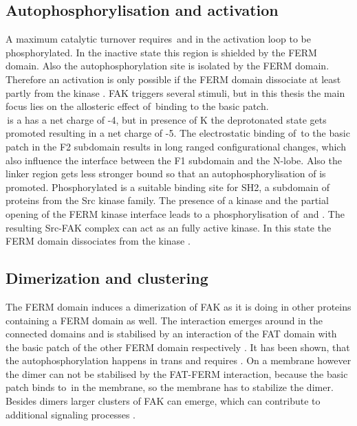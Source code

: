 \subsection{Autophosphorylisation and activation}
A maximum catalytic turnover requires \,and  in the activation loop to be phosphorylated. In the inactive state this region is shielded by the FERM domain. Also the autophosphorylation site  is isolated by the FERM domain. Therefore an activation is only possible if the FERM domain dissociate at least partly from the kinase \autocite{structFAK}. FAK triggers several stimuli, but in this thesis the main focus lies on the allosteric effect of \pip\,binding to the basic patch.\\
\pip\,is a has a net charge of -4, but in presence of K the deprotonated state gets promoted resulting in a net charge of -5. The electrostatic binding of \pip\,to the basic patch in the F2 subdomain results in long ranged configurational changes, which also influence the interface between the F1 subdomain and the N-lobe. Also the linker region gets less stronger bound so that an autophosphorylisation of  is promoted. Phosphorylated  is a suitable binding site for SH2, a subdomain of proteins from the Src kinase family. The presence of a kinase and the partial opening of the FERM kinase interface leads to a phosphorylisation of \,and . The resulting Src-FAK complex can act as an fully active kinase. In this state the FERM domain dissociates from the kinase \autocites{pap003}{pap001}.
\subsection{Dimerization and clustering}
The FERM domain induces a dimerization of FAK as it is doing in other proteins containing a FERM domain as well. The interaction emerges around  in the connected domains and is stabilised by an interaction of the FAT domain with the basic patch of the other FERM domain respectively \autocite{fakdimers}. It has been shown, that the autophosphorylation happens in trans \autocite{transAuto} and requires  \autocite{fakdimers}. On a membrane however the dimer can not be stabilised by the FAT-FERM interaction, because the basic patch binds to \pip\,in the membrane, so the membrane has to stabilize the dimer. Besides dimers larger clusters of FAK can emerge, which can contribute to additional signaling processes \autocite{dimersVsClusters}.
